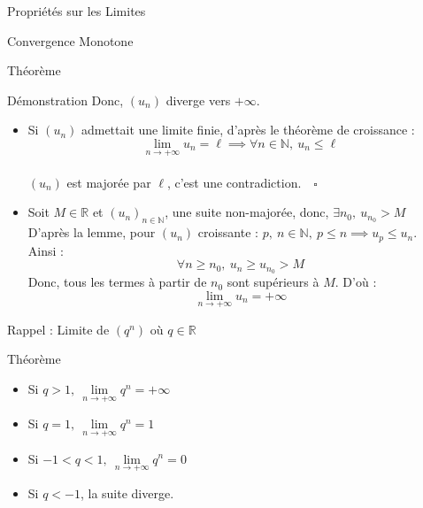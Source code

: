 \documentclass{cours}
\begin{document}
\begin{Gpartie}{Propriétés sur les Limites}
\begin{Spartie}{Convergence Monotone}
\begin{SSpartie}{Théorème}
\begin{SSSpartie}{Démonstration}
                    Donc, $(u_n)$ diverge vers $+\infty$.
                    \begin{itemize}
                        \item Si $(u_n)$ admettait une limite finie, d'après le théorème de croissance :
                        \[\lim\limits_{n\to +\infty}u_n=\ell\implies\forall n\in\mathbb{N},\ u_n\leq\ell\] \\ $(u_n)$ est majorée par $\ell$, c'est une contradiction.$\quad\square$
                        \\[2ex]
                        \item Soit $M\in\mathbb{R}$ et $(u_n)_{n\in\mathbb{N}}$, une suite non-majorée, donc, $\exists n_0,\ u_{n_0}>M$ \\ D'après la lemme, pour $(u_n)$ croissante : $p,~n\in\mathbb{N},\ p\leq n\implies u_p\leq u_n$. \\ Ainsi : \[\forall n\geq n_0,\ u_n\geq u_{n_0}>M\] Donc, tous les termes à partir de $n_0$ sont supérieurs à $M$. D'où : \[\lim\limits_{n\to +\infty}u_n=+\infty\]
                    \end{itemize}
                \end{SSSpartie}
            \end{SSpartie}
        \end{Spartie}
        \begin{Spartie}{Rappel : Limite de $\left(q^n\right)$ où $q\in\mathbb{R}$} 
            \begin{SSpartie}{Théorème} 
                \begin{itemize}
                    \setlength\itemsep{0.5em}
                    \item Si $q>1,~\lim\limits_{n\to+\infty}q^n=+\infty$
                    \item Si $q=1,~\lim\limits_{n\to+\infty}q^n=1$
                    \item Si $-1<q<1,~\lim\limits_{n\to+\infty}q^n=0$
                    \item Si $q<-1$, la suite diverge.
                \end{itemize}
            \end{SSpartie}
        \end{Spartie}
    \end{Gpartie}
    \pagebreak
\end{document}
